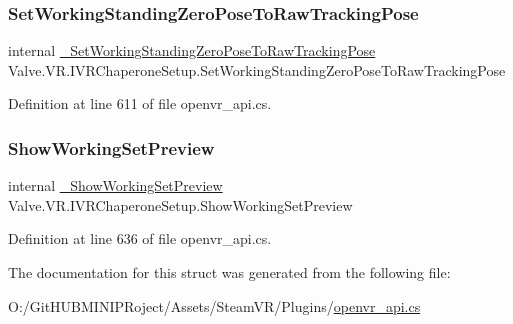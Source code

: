 \subsubsection{\texorpdfstring{SetWorkingStandingZeroPoseToRawTrackingPose}{SetWorkingStandingZeroPoseToRawTrackingPose}}
{\footnotesize\ttfamily internal \mbox{\hyperlink{struct_valve_1_1_v_r_1_1_i_v_r_chaperone_setup_a7cc1138b7593b23c7ac311cb1ecacb1f}{\+\_\+\+Set\+Working\+Standing\+Zero\+Pose\+To\+Raw\+Tracking\+Pose}} Valve.\+V\+R.\+I\+V\+R\+Chaperone\+Setup.\+Set\+Working\+Standing\+Zero\+Pose\+To\+Raw\+Tracking\+Pose}



Definition at line 611 of file openvr\+\_\+api.\+cs.

\mbox{\label{struct_valve_1_1_v_r_1_1_i_v_r_chaperone_setup_a059557c591d436a29134e8280afab7db}} 
\subsubsection{\texorpdfstring{ShowWorkingSetPreview}{ShowWorkingSetPreview}}
{\footnotesize\ttfamily internal \mbox{\hyperlink{struct_valve_1_1_v_r_1_1_i_v_r_chaperone_setup_a3bfcf023d5b22e50ec327fd4862751a1}{\+\_\+\+Show\+Working\+Set\+Preview}} Valve.\+V\+R.\+I\+V\+R\+Chaperone\+Setup.\+Show\+Working\+Set\+Preview}



Definition at line 636 of file openvr\+\_\+api.\+cs.



The documentation for this struct was generated from the following file\+:\begin{DoxyCompactItemize}
\item 
O\+:/\+Git\+H\+U\+B\+M\+I\+N\+I\+P\+Roject/\+Assets/\+Steam\+V\+R/\+Plugins/\mbox{\hyperlink{openvr__api_8cs}{openvr\+\_\+api.\+cs}}\end{DoxyCompactItemize}
